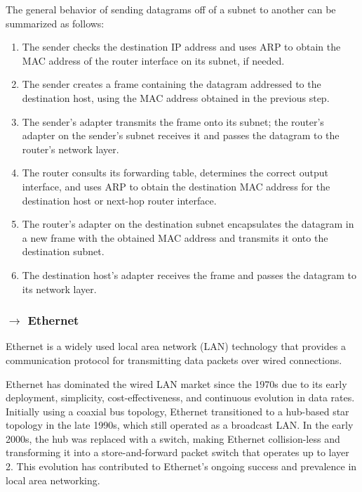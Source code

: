 \vspace{1 em}
\noindent The general behavior of sending datagrams off of a subnet to another can be summarized as follows:
\begin{enumerate}
    \item The sender checks the destination IP address and uses ARP to obtain the MAC address of the router interface on its subnet, if needed.
    \item The sender creates a frame containing the datagram addressed to the destination host, using the MAC address obtained in the previous step.
    \item The sender's adapter transmits the frame onto its subnet; the router's adapter on the sender's subnet receives it and passes the datagram to the router's network layer.
    \item The router consults its forwarding table, determines the correct output interface, and uses ARP to obtain the destination MAC address for the destination host or next-hop router interface.
    \item The router's adapter on the destination subnet encapsulates the datagram in a new frame with the obtained MAC address and transmits it onto the destination subnet.
    \item The destination host's adapter receives the frame and passes the datagram to its network layer.
\end{enumerate}


\clearpage 
\subsubsection[5.4.2 Ethernet]{$\rightarrow$ Ethernet}

\noindent Ethernet is a widely used local area network (LAN) technology that provides a communication protocol for transmitting data packets over wired connections.

\vspace{1em}
\noindent Ethernet has dominated the wired LAN market since the 1970s due to its early deployment, simplicity, cost-effectiveness, and continuous evolution in data rates. Initially using a coaxial bus topology, Ethernet transitioned to a hub-based star topology in the late 1990s, which still operated as a broadcast LAN. In the early 2000s, the hub was replaced with a switch, making Ethernet collision-less and transforming it into a store-and-forward packet switch that operates up to layer 2. This evolution has contributed to Ethernet's ongoing success and prevalence in local area networking.

